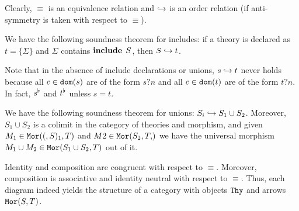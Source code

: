 Clearly, $\equiv$ is an equivalence relation and $\hookrightarrow$ is an order relation (if anti-symmetry is taken with respect to $\equiv$).

\begin{example}\label{rel:incl}
We have the following soundness theorem for includes: if a theory is declared as $t=\{\Sigma\}$ and $\Sigma$ contains $\operatorname{\mathbf{include}}{\;S}$, then $S\hookrightarrow t$.

Note that in the absence of include declarations or unions, $s\hookrightarrow t$ never holds because all $c\in\mathtt{dom}(s)$ are of the form $s?n$ and all $c\in\mathtt{dom}(t)$ are of the form $t?n$.
In fact, $s^\flat$ and $t^\flat$ unless $s=t$.
\end{example}

\begin{example}\label{rel:union}
We have the following soundness theorem for unions: $S_i\hookrightarrow S_1\cup S_2$.
Moreover, $S_1\cup S_2$ is a colimit in the category of theories and morphism, and given $M_1\in\mathtt{Mor}((,S)_1,T)$ and $M2\in\Mo{S_2,T}$ we have the universal morphism $M_1\cup M_2\in\mathtt{Mor}(S_1\cup S_2,T)$ out of it.
\end{example}

\begin{example}\label{rel:cat}
Identity and composition are congruent with respect to $\equiv$.
Moreover, composition is associative and identity neutral with respect to $\equiv$.
Thus, each diagram indeed yields the structure of a category with objects $\mathtt{Thy}$ and arrows $\mathtt{Mor}(S,T)$.
\end{example}
